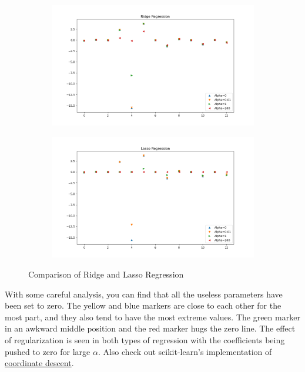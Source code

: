 \documentclass{article}
\begin{document}
\begin{figure}[H]
\centering
\begin{subfigure}{.5\textwidth}
  \centering
  \includegraphics[width=\linewidth]{Images/ridge_reg.png}
  \caption{}
\end{subfigure}%
\begin{subfigure}{.5\textwidth}
  \centering
  \includegraphics[width=\linewidth]{Images/lasso_reg.png}
  \caption{}
\end{subfigure}
\caption{Comparison of Ridge and Lasso Regression}
\end{figure}

With some careful analysis, you can find that all the useless parameters have been set to zero. The yellow and blue markers are close to each other for the most part, and they also tend to have the most extreme values. The green marker in an awkward middle position and the red marker hugs the zero line. The effect of regularization is seen in both types of regression with the coefficients being pushed to zero for large $\alpha$. Also check out scikit-learn's implementation of \href{https://scikit-learn.org/stable/auto_examples/linear_model/plot_lasso_coordinate_descent_path.html#sphx-glr-auto-examples-linear-model-plot-lasso-coordinate-descent-path-py}{coordinate descent}.
\end{document}
